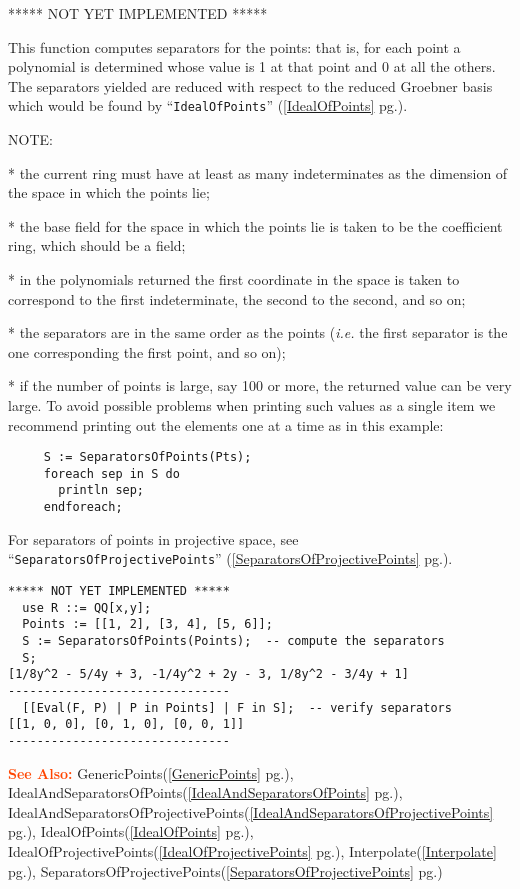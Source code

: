 \documentclass[a4paper]{mybook}
\newenvironment{command}{}{} %
\newcommand\SeeAlso{\par\textcolor{OrangeRed}{\textbf{\large See Also: }}}
\begin{document}
\begin{command}
***** NOT YET IMPLEMENTED *****
\par 
This function computes separators for the points: that is, for each
point a polynomial is determined whose value is 1 at that point and 0
at all the others.  The separators yielded are reduced with respect to
the reduced Groebner basis which would be found by ``\verb&IdealOfPoints&'' (\ref{IdealOfPoints} pg.\pageref{IdealOfPoints}).
\par 
NOTE:
\par 
 * the current ring must have at least as many indeterminates as the
   dimension of the space in which the points lie;
\par 
 * the base field for the space in which the points lie is taken to be
   the coefficient ring, which should be a field;
\par 
 * in the polynomials returned the first coordinate in the space is
   taken to correspond to the first indeterminate, the second to the
   second, and so on;
\par 
 * the separators are in the same order as the points (\textit{i.e.} the first
   separator is the one corresponding the first point, and so on);
\par 
 * if the number of points is large, say 100 or more, the returned
   value can be very large.  To avoid possible problems when printing
   such values as a single item we recommend printing out the elements
   one at a time as in this example:
\begin{verbatim}
     S := SeparatorsOfPoints(Pts);
     foreach sep in S do
       println sep;
     endforeach;
\end{verbatim}
For separators of points in projective space, see
``\verb&SeparatorsOfProjectivePoints&'' (\ref{SeparatorsOfProjectivePoints} pg.\pageref{SeparatorsOfProjectivePoints}).
\begin{Verbatim}[label=example, rulecolor=\color{PineGreen}, frame=single]
***** NOT YET IMPLEMENTED *****
  use R ::= QQ[x,y];
  Points := [[1, 2], [3, 4], [5, 6]];
  S := SeparatorsOfPoints(Points);  -- compute the separators
  S;
[1/8y^2 - 5/4y + 3, -1/4y^2 + 2y - 3, 1/8y^2 - 3/4y + 1]
-------------------------------
  [[Eval(F, P) | P in Points] | F in S];  -- verify separators
[[1, 0, 0], [0, 1, 0], [0, 0, 1]]
-------------------------------
\end{Verbatim}


\SeeAlso %
  GenericPoints(\ref{GenericPoints} pg.\pageref{GenericPoints}), 
    IdealAndSeparatorsOfPoints(\ref{IdealAndSeparatorsOfPoints} pg.\pageref{IdealAndSeparatorsOfPoints}), 
    IdealAndSeparatorsOfProjectivePoints(\ref{IdealAndSeparatorsOfProjectivePoints} pg.\pageref{IdealAndSeparatorsOfProjectivePoints}), 
    IdealOfPoints(\ref{IdealOfPoints} pg.\pageref{IdealOfPoints}), 
    IdealOfProjectivePoints(\ref{IdealOfProjectivePoints} pg.\pageref{IdealOfProjectivePoints}), 
    Interpolate(\ref{Interpolate} pg.\pageref{Interpolate}), 
    SeparatorsOfProjectivePoints(\ref{SeparatorsOfProjectivePoints} pg.\pageref{SeparatorsOfProjectivePoints})
\end{command} %
\end{document}
